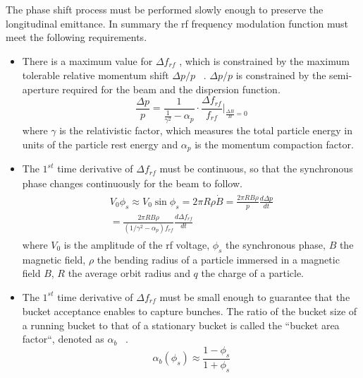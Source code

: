 The phase shift process must be performed slowly enough to preserve the longitudinal emittance. In summary the rf frequency modulation function must meet the following requirements.   
\begin{itemize}
	\item There is a maximum value for $\Delta f_\mathit{rf}$ , which is constrained by the maximum tolerable relative momentum shift $\Delta p/p$ ~\cite{bovet_selection_1970}. $\Delta p/p$ is constrained by the semi-aperture required for the beam and the dispersion function. 
\begin{equation}
\frac{\Delta{p}}{p}  = \frac{1}{\frac{1}{\gamma^2}-\alpha_{\mathit{p}}}\cdot \frac{\Delta f_{\mathit{rf}}}{f_{\mathit{rf}}}|_{\frac{\Delta{B}}{B}=0}
\label{eq:phaseP11}
\end{equation}
where $\gamma$ is the relativistic factor, which measures the total particle energy in units of the particle rest energy and $\alpha_{\mathit{p}}$ is the momentum compaction factor.

	\item The $1^\mathit{st}$ time derivative of $\Delta f_\mathit{rf}$ must be continuous, so that the synchronous phase changes continuously for the beam to follow. 
\begin{eqnarray}
\begin{aligned}
	V_0\phi_s\approx V_0\sin\phi_s=2\pi R\rho\dot{B}=\frac{2\pi R B\rho}{p} \frac{d \Delta p}{dt}\\=\frac{2\pi R B\rho}{(1/\gamma^2-\alpha_p)f_\mathit{rf}} \frac{d \Delta f_\mathit{rf}}{dt}\label{eq2}
\end{aligned}
\end{eqnarray}
where $V_0$ is the amplitude of the rf voltage, $\phi_s$ the synchronous phase, $B$ the magnetic field, $\rho$ the bending radius of a particle immersed in a magnetic field $B$, $R$ the average orbit radius and $q$ the charge of a particle.
	\item The $1^\mathit{st}$ time derivative of $\Delta f_\mathit{rf}$ must be small enough to guarantee that the bucket acceptance enables to capture bunches. 
The ratio of the bucket size of a running bucket to that of a stationary bucket is called the ``bucket area factor``, denoted as $\alpha_b$ ~\cite{lee_accelerator_2011}.
\begin{equation} 
\label{bucket_size}
\alpha_b(\phi_{s})\approx \frac{1-\phi_{s}}{1+\phi_{s}}
\end{equation} 


\end{itemize}
